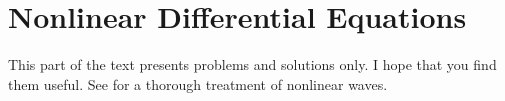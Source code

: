\part{Nonlinear Differential Equations}

This part of the text presents problems and solutions only.  I hope that 
you find them useful.  See \cite{whitham:1974} for a thorough treatment
of nonlinear waves.





